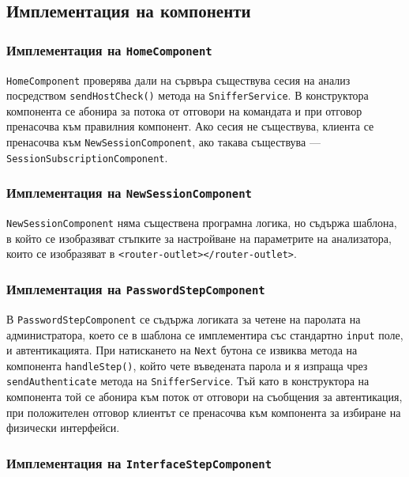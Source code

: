 \documentclass[12pt,a4paper,oneside]{book}
\begin{document}
\subsection{Имплементация на компоненти}

\subsubsection{Имплементация на \texttt{HomeComponent}}

\texttt{HomeComponent} проверява дали на сървъра съществува сесия на анализ
посредством \texttt{sendHostCheck()} метода на \texttt{SnifferService}. В
конструктора компонента се абонира за потока от отговори на командата и при
отговор пренасочва към правилния компонент. Ако сесия не съществува,
клиента се пренасочва към \texttt{NewSessionComponent}, ако такава
съществува --- \texttt{SessionSubscriptionComponent}.

\subsubsection{Имплементация на \texttt{NewSessionComponent}}

\texttt{NewSessionComponent} няма съществена програмна логика, но съдържа
шаблона, в който се изобразяват стъпките за настройване на параметрите на
анализатора, които се изобразяват в \texttt{<router-outlet></router-outlet>}.

\subsubsection{Имплементация на \texttt{PasswordStepComponent}}

В \texttt{PasswordStepComponent} се съдържа логиката за четене на
паролата на администратора, което се в шаблона се имплементира със
стандартно \texttt{input} поле, и автентикацията. При натискането на
\texttt{Next} бутона се извиква метода на компонента \texttt{handleStep()},
който чете въведената парола и я изпраща
чрез \texttt{sendAuthenticate} метода на
\texttt{SnifferService}. Тъй като в конструктора на компонента той се
абонира към поток от отговори на съобщения за автентикация, при положителен
отговор клиентът се пренасочва към компонента за избиране на физически
интерфейси.

\subsubsection{Имплементация на \texttt{InterfaceStepComponent}}
\end{document}
